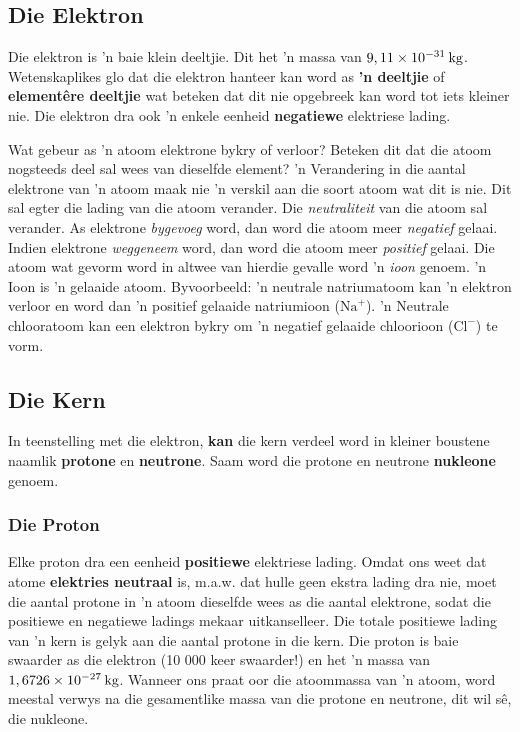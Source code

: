 \subsection*{Die Elektron}
\nopagebreak
\label{m38745*id255241}
Die elektron is  'n baie klein deeltjie. Dit het  'n massa van $9,11\ensuremath{\times}{10}^{-31}\phantom{\rule{2pt}{0ex}}\text{kg}$. Wetenskaplikes glo dat die elektron hanteer kan word as \textbf{ 'n deeltjie} of \textbf{element\^{e}re deeltjie} wat beteken dat dit nie opgebreek kan word tot iets kleiner nie. Die elektron dra ook  'n enkele eenheid \textbf{negatiewe} elektriese lading.\par 
\label{m38745*eip-222}
Wat gebeur as  'n atoom elektrone bykry of verloor? Beteken dit dat die atoom nogsteeds deel sal wees van dieselfde element?  'n Verandering in die aantal elektrone van 'n atoom maak nie   'n verskil aan die soort atoom wat dit is nie. Dit sal egter die lading van die atoom verander. Die \textsl{neutraliteit} van die atoom sal verander. As elektrone \textsl{bygevoeg} word, dan word die atoom meer \textsl{negatief} gelaai. Indien elektrone \textsl{weggeneem} word, dan word die atoom meer \textsl{positief} gelaai. Die atoom wat gevorm word in altwee van hierdie gevalle word  'n \textsl{ioon} genoem.  'n Ioon is 'n gelaaide atoom. Byvoorbeeld:  'n neutrale natriumatoom kan 'n elektron verloor en word dan  'n positief gelaaide natriumioon ($\text{Na}^{+}$).  'n Neutrale chlooratoom kan een elektron bykry om  'n negatief gelaaide chloorioon ($\text{Cl}^{-}$) te vorm.\par 


      
\subsection*{Die Kern}
\nopagebreak
\label{m38745*id255305}
In teenstelling met die elektron, \textbf{kan} die kern verdeel word in kleiner boustene naamlik \textbf{protone} en \textbf{neutrone}. Saam word die protone en neutrone \textbf{nukleone} genoem.\par 
        
\subsubsection*{Die Proton}
\nopagebreak
\label{m38745*id255338}
Elke proton dra een eenheid \textbf{positiewe} elektriese lading. Omdat ons weet dat atome \textbf{elektries neutraal} is, m.a.w. dat hulle geen ekstra lading dra nie, moet die aantal protone in  'n atoom dieselfde wees as die aantal elektrone, sodat die positiewe en negatiewe ladings mekaar uitkanselleer. Die totale positiewe lading van  'n kern is gelyk aan die aantal protone in die kern. Die proton is baie swaarder as die elektron (10 000 keer swaarder!) en het  'n massa van $1,6726\ensuremath{\times}{10}^{-27}\phantom{\rule{2pt}{0ex}}\text{kg}$. Wanneer ons praat oor die atoommassa van  'n atoom, word meestal verwys na die gesamentlike massa van die protone en neutrone, dit wil s\^{e}, die nukleone.\par 

